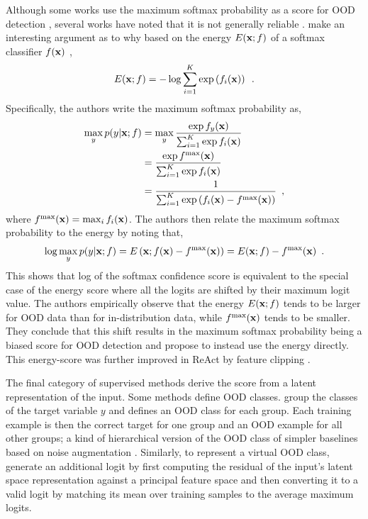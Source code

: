 Although some works use the maximum softmax probability as a score for OOD detection \parencite{hendrycks_deep_2019,ren_likelihood_2019}, several works have noted that it is not generally reliable \parencite{hendrycks_scaling_2022,liu_energybased_2020}. 
\textcite{liu_energybased_2020} make an interesting argument as to why based on the energy $E({\mathbf{x}}; f)$ of a softmax classifier $f({\mathbf{x}})$ \parencite{lecun_tutorial_2006},
%
\begin{equation} \label{eq:softmax-classifier-energy}
    E(\xb; f) = - \log \sum_{i=1}^K \exp \left( f_i(\xb) \right) \enspace .
\end{equation}
%
Specifically, the authors write the maximum softmax probability as,
%
\begin{align} \label{eq:softmax-classifier-maximum-probability}
    \max_y p(y|\xb;f) 
    &= \max_y \frac{\exp f_y(\xb)}{\sum_{i=1}^K \exp f_i(\xb)} \nonumber \\
    &= \frac{\exp f^\text{max}(\xb)}{\sum_{i=1}^K \exp f_i(\xb)} \nonumber \\
    &= \frac{1}{\sum_{i=1}^K \exp \left(f_i(\xb) - f^\text{max}(\xb)\right)} \enspace ,
\end{align}
where $f^\text{max}({\mathbf{x}}) = \max_i f_i({\mathbf{x}})$. 
The authors then relate the maximum softmax probability to the energy by noting that,
%
\begin{align}
    \log \max_y p(y|{\mathbf{x}};f) = E\left({\mathbf{x}}; f({\mathbf{x}}) - f^\text{max}({\mathbf{x}})\right) = E({\mathbf{x}}; f) - f^\text{max}({\mathbf{x}}) \enspace .
\end{align}
%
This shows that log of the softmax confidence score is equivalent to the special case of the energy score where all the logits are shifted by their maximum logit value. 
The authors empirically observe that the energy $E({\mathbf{x}}; f)$ tends to be larger for OOD data than for in-distribution data, while $f^\text{max}({\mathbf{x}})$ tends to be smaller. 
They conclude that this shift results in the maximum softmax probability being a biased score for OOD detection and propose to instead use the energy directly. This energy-score was further improved in ReAct by feature clipping \parencite{sun_react_2021}. 

The final category of supervised methods derive the score from a latent representation of the input. 
Some methods define OOD classes. 
\textcite{huang_mos_2021} group the classes of the target variable $y$ and defines an OOD class for each group. Each training example is then the correct target for one group and an OOD example for all other groups; a kind of hierarchical version of the OOD class of simpler baselines based on noise augmentation \parencite{ren_likelihood_2019}. 
Similarly, to represent a virtual OOD class, \textcite{wang_vim_2022} generate an additional logit by first computing the residual of the input's latent space representation against a principal feature space and then converting it to a valid logit by matching its mean over training samples to the average maximum logits. 

